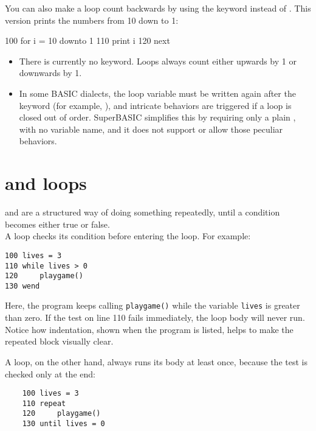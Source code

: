 You can also make a loop count backwards by using the  keyword instead of . This version prints the numbers from 10 down to 1:

\begin{lst}
100 for i = 10 downto 1
110   print i
120 next
\end{lst}

\begin{compatibilitynote}
\begin{itemize}[itemsep=0pt, left=3pt, label=--]
  \item There is currently no  keyword. Loops always count either upwards by 1 or downwards by 1.
  \item In some BASIC dialects, the loop variable must be written again after the  keyword (for example, ), and intricate behaviors are triggered if a loop is closed out of order. SuperBASIC simplifies this by requiring only a plain , with no variable name, and it does not support or allow those peculiar behaviors.
\end{itemize}
\end{compatibilitynote}

\section{ and  loops}

 and  are a structured way of doing something repeatedly, until a condition becomes either true or false.\\

A  loop checks its condition before entering the loop. For example:

\begin{verbatim}
100 lives = 3
110 while lives > 0
120 	playgame()
130 wend
\end{verbatim}

Here, the program keeps calling \texttt{playgame()} while the variable \texttt{lives} is greater than zero. If the test on line 110 fails immediately, the loop body will never run. Notice how indentation, shown when the program is listed, helps to make the repeated block visually clear.

A  loop, on the other hand, always runs its body at least once, because the test is checked only at the end:

\begin{verbatim}
	100 lives = 3
	110 repeat
	120 	playgame()
	130 until lives = 0
\end{verbatim}

